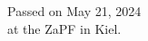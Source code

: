 \documentclass[DIV=calc]{scrartcl}
\begin{document}





%
\vfill
\begin{flushright}
	Passed on May 21, 2024 \\
	at the ZaPF in Kiel.
\end{flushright}
\end{document}
